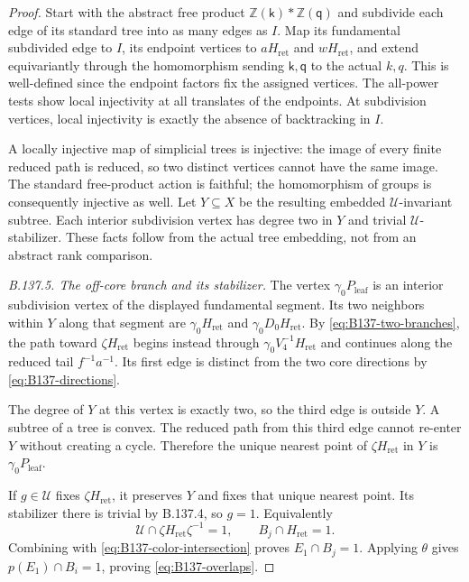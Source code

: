 \begin{proof}
Start with the abstract free product
$\mathbb Z(\mathsf k)*\mathbb Z(\mathsf q)$ and subdivide
each edge of its standard tree into as many edges as $I$.
Map its fundamental subdivided edge to $I$, its endpoint
vertices to $aH_{\mathrm{ret}}$ and $wH_{\mathrm{ret}}$,
and extend equivariantly through the homomorphism sending
$\mathsf k,\mathsf q$ to the actual $k,q$. This is
well-defined since the endpoint factors fix the assigned
vertices. The all-power tests show local injectivity at
all translates of the endpoints. At subdivision vertices,
local injectivity is exactly the absence of backtracking
in $I$.

A locally injective map of simplicial trees is injective:
the image of every finite reduced path is reduced, so two
distinct vertices cannot have the same image. The standard
free-product action is faithful; the homomorphism of groups
is consequently injective as well. Let $Y\subseteq X$ be
the resulting embedded $\mathscr U$-invariant subtree.
Each interior subdivision vertex has degree two in $Y$
and trivial $\mathscr U$-stabilizer. These facts follow
from the actual tree embedding, not from an abstract rank
comparison.

\emph{B.137.5. The off-core branch and its stabilizer.}
The vertex $\gamma_0P_{\mathrm{leaf}}$ is an interior
subdivision vertex of the displayed fundamental segment.
Its two neighbors within $Y$ along that segment are
$\gamma_0H_{\mathrm{ret}}$ and
$\gamma_0D_0H_{\mathrm{ret}}$.
By \eqref{eq:B137-two-branches}, the path toward
$\zeta H_{\mathrm{ret}}$ begins instead through
$\gamma_0V_4^{-1}H_{\mathrm{ret}}$ and continues along
the reduced tail $f^{-1}a^{-1}$. Its first edge is distinct
from the two core directions by \eqref{eq:B137-directions}.

The degree of $Y$ at this vertex is exactly two, so the
third edge is outside $Y$. A subtree of a tree is convex.
The reduced path from this third edge cannot re-enter $Y$
without creating a cycle. Therefore the unique nearest
point of $\zeta H_{\mathrm{ret}}$ in $Y$ is
$\gamma_0P_{\mathrm{leaf}}$.

If $g\in\mathscr U$ fixes $\zeta H_{\mathrm{ret}}$, it
preserves $Y$ and fixes that unique nearest point. Its
stabilizer there is trivial by B.137.4, so $g=1$.
Equivalently
\[
 \mathscr U\cap\zeta H_{\mathrm{ret}}\zeta^{-1}=1,
 \qquad B_j\cap H_{\mathrm{ret}}=1.
\]
Combining with \eqref{eq:B137-color-intersection} proves
$E_1\cap B_j=1$. Applying $\theta$ gives
$p(E_1)\cap B_i=1$, proving \eqref{eq:B137-overlaps}.


\end{proof}
